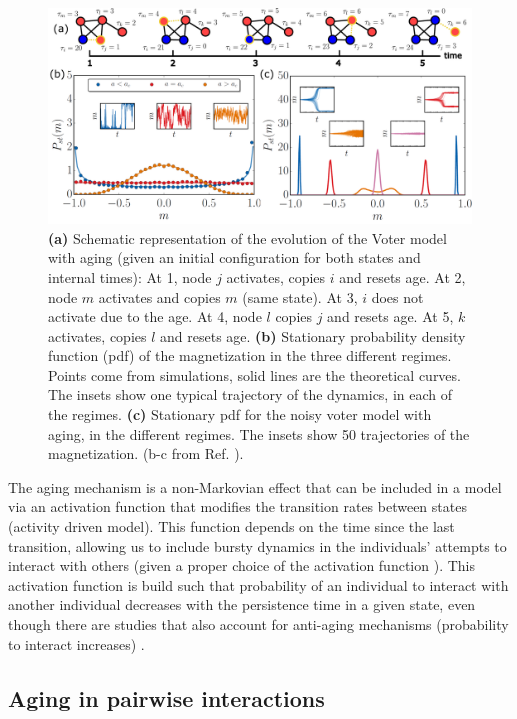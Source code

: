 \begin{figure}[t]
    \centering
    \captionsetup{font=sf}
    \includegraphics[width=\textwidth]{Figs/Introduction/aging_plot.pdf}
    \caption[Aging in the Voter model]{\textbf{(a)} Schematic representation of the evolution of the Voter model with aging (given an initial configuration for both states and internal times): At 1, node $j$ activates, copies $i$ and resets age. At 2, node $m$ activates and copies $m$ (same state). At 3, $i$ does not activate due to the age. At 4, node $l$ copies $j$ and resets age. At 5, $k$ activates, copies $l$ and resets age. \textbf{(b)} Stationary probability density function (pdf) of the magnetization in the three different regimes. Points come from simulations, solid lines are the theoretical curves. The insets show one typical trajectory of the dynamics, in each of the regimes. \textbf{(c)} Stationary pdf for the noisy voter model with aging, in the different regimes. The insets show 50 trajectories of the magnetization. (b-c from Ref. \cite{artime-2017}).}
    \label{fig:aging_pdf}
\end{figure}

The aging mechanism is a non-Markovian effect that can be included in a model via an activation function that modifies the transition rates between states (activity driven model). This function depends on the time since the last transition, allowing us to include bursty dynamics in the individuals' attempts to interact with others (given a proper choice of the activation function \cite{fernandez-gracia-2011}). This activation function is build such that probability of an individual to interact with another individual decreases with the persistence time in a given state, even though there are studies that also account for anti-aging mechanisms (probability to interact increases) \cite{peralta-2020,chen-2020}.

\subsection{\label{sec:Aging in pairwise interactions} Aging in pairwise interactions}

